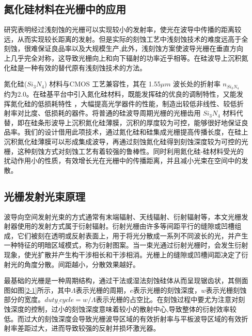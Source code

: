 \documentclass[UTF8,a4paper,12pt]{ctexart}
\numberwithin{equation}{section}
\begin{document}
\subsection{氮化硅材料在光栅中的应用}

研究表明经过浅刻蚀的光栅可以实现较小的发射率，使光在波导中传播的距离较远，从而实现较长距离的发射。但是实际的刻蚀工艺中浅刻蚀技术的难度远高于全刻蚀，很难保证良品率以及大规模生产,此外，浅刻蚀方案使波导光栅在垂直方向上几乎完全对称，这导致光栅向上和向下辐射的功率近乎相等。在硅波导上沉积氮化硅是一种有效的替代原有浅刻蚀技术的方法。


氮化硅($Si_3 N_4$) 材料与CMOS 工艺兼容性，其在 1.55$\mu m$ 波长处的折射率 $n_{Si_3 N_4}$ 约为2.0。在硅基平台中引入氮化硅材料，既能发挥硅的优良的调制特性，又能发挥氮化硅的低损耗特性 ，大幅提高光学器件的性能，制造出较低非线性、较低折射率对比度、低损耗的器件。将普通的硅波导周期光栅的光栅齿用 $Si_3 N_4$ 材料代替，即在硅条形波导上沉积氮化硅薄膜，沉积的厚度较为可控，能够很好地保证良品率。我们的设计借用此项技术，通过氮化硅和硅集成光栅提高传播长度，在硅上沉积氮化硅薄膜可以形成集成波导，再通过刻蚀氮化硅得到刻蚀深度较为可控的光栅，这种刻蚀方式对刻蚀工艺有着较强的鲁棒性。同时利用氮化硅-硅材料受光的扰动作用小的性质，有效增长光在光栅中的传播距离，并且减小光束在空间中的发散。

\subsection{光栅发射光束原理}
\label{sec2-2}
波导向空间发射光束的方式通常有末端辐射、天线辐射、衍射辐射等，本文光栅发射器使用的发射方式属于衍射辐射。衍射光栅由许多等间距平行的缝隙或凹槽组成，它们被刻在透明或反射表面上，用于将光分散成一系列不同波长的光，并产生一种特征的明暗区域模式，称为衍射图案。当一束光通过衍射光栅时，会发生衍射现象，使光扩散并产生构干涉相长和干涉相消。光栅上的缝隙或凹槽间距决定了衍射光的角度分散。间距越小，分散效果越好。

最基础的光栅是一种周期结构，通过干法或湿法刻蚀硅体从而呈现锯齿状，其侧面图如图\ref{2-1}所示，其中$\Lambda$表示光栅的周期，$e$表示光栅的刻蚀深度，$w$表示光栅刻蚀部分的宽度。$duty \underline{~}cycle = w/\Lambda$表示光栅的占空比。在刻蚀过程中要尤为注意对刻蚀深度的控制，过小的刻蚀深度意味着较小的散射中心,导致整体的衍射效率较低。而过大的刻蚀深度会导致光栅波导区域的有效折射率与平板波导区域的有效折射率差距过大，进而导致较强的反射并损坏激光器。
\end{document}
